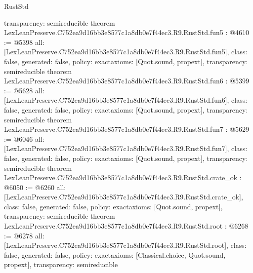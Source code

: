 \begin{lexlean}{RustStd}
\begin{coremodule}
{  transparency: semireducible
}
theorem LexLeanPreserve.C752ea9d16bb3e8577c1a8db0e7f44ec3.R9.RustStd.fun5 : @4610 := @5398 {
  all: [LexLeanPreserve.C752ea9d16bb3e8577c1a8db0e7f44ec3.R9.RustStd.fun5],
  class: false,
  generated: false,
  policy: exact{axioms: [Quot.sound, propext]},
  transparency: semireducible
}
theorem LexLeanPreserve.C752ea9d16bb3e8577c1a8db0e7f44ec3.R9.RustStd.fun6 : @5399 := @5628 {
  all: [LexLeanPreserve.C752ea9d16bb3e8577c1a8db0e7f44ec3.R9.RustStd.fun6],
  class: false,
  generated: false,
  policy: exact{axioms: [Quot.sound, propext]},
  transparency: semireducible
}
theorem LexLeanPreserve.C752ea9d16bb3e8577c1a8db0e7f44ec3.R9.RustStd.fun7 : @5629 := @6046 {
  all: [LexLeanPreserve.C752ea9d16bb3e8577c1a8db0e7f44ec3.R9.RustStd.fun7],
  class: false,
  generated: false,
  policy: exact{axioms: [Quot.sound, propext]},
  transparency: semireducible
}
theorem LexLeanPreserve.C752ea9d16bb3e8577c1a8db0e7f44ec3.R9.RustStd.crate_ok : @6050 := @6260 {
  all: [LexLeanPreserve.C752ea9d16bb3e8577c1a8db0e7f44ec3.R9.RustStd.crate_ok],
  class: false,
  generated: false,
  policy: exact{axioms: [Quot.sound, propext]},
  transparency: semireducible
}
theorem LexLeanPreserve.C752ea9d16bb3e8577c1a8db0e7f44ec3.R9.RustStd.root : @6268 := @6278 {
  all: [LexLeanPreserve.C752ea9d16bb3e8577c1a8db0e7f44ec3.R9.RustStd.root],
  class: false,
  generated: false,
  policy: exact{axioms: [Classical.choice, Quot.sound, propext]},
  transparency: semireducible
}


\end{coremodule}
\end{lexlean}
